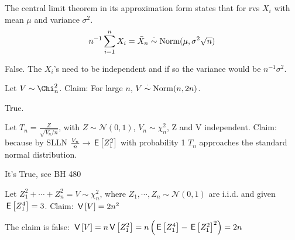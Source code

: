 \documentclass[tf-tutorial-all.tex]{subfiles}
\begin{document}
\begin{truefalse}
  The central limit theorem in its approximation form states that for
  rvs $X_i$ with mean $\mu$ and variance $\sigma^2$.
  $$ n^{-1}\sum_{i=1}^n X_i = \bar X_n \stackrel{\cdot}\sim \mathrm{Norm}(\mu, \sigma^2 \sqrt{n}) $$
\begin{solution}
False. The $X_i$'s need to be independent and if so the variance would be $n^{-1}\sigma^2$.
\end{solution}
\end{truefalse}

\begin{truefalse}
  Let $V \sim \Chi^2_n$. Claim: For large $n$, $V \stackrel{\cdot}\sim \mathrm{Norm}(n, 2n)$.
\begin{solution}
True.
\end{solution}
\end{truefalse}

\begin{truefalse}
Let $T_n = \frac{Z}{\sqrt{V_n/n}}$, with $Z\sim \mathcal{N}(0,1)$, $V_n\sim \chi_n^2$, Z and V independent. Claim:
because by SLLN $\frac{V_n}{n}\rightarrow \,\mathsf{E}\left[Z_1^2\right]$ with probability 1 $T_n$ approaches the standard normal distribution.
\begin{solution}
It's True, see BH 480
\end{solution}
\end{truefalse}

\begin{truefalse}
Let $Z_1^2 + \cdots + Z_n^2 = V \sim \chi^2_n$, where $Z_1, \cdots ,Z_n \sim \mathcal{N}(0,1)$ are i.i.d. and given $\,\mathsf{E}\left[Z_1^4\right] = 3$. Claim:
$\,\mathsf{V}\left[V\right] = 2n^2$
\begin{solution}
The claim is false: $\,\mathsf{V}\left[V\right] = n\,\mathsf{V}\left[Z_1^2\right] = n\left(\,\mathsf{E}\left[Z_1^4\right] - \,\mathsf{E}\left[Z_1^2\right]^2\right) = 2n$
\end{solution}
\end{truefalse}
\end{document}
